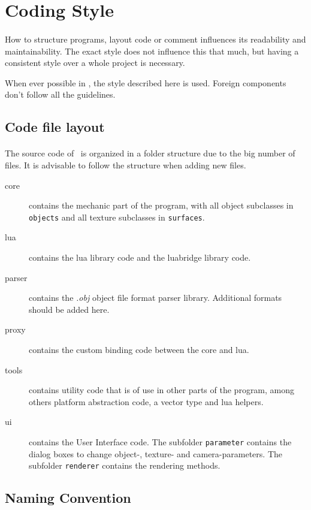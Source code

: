 \section{Coding Style\label{Style}}
\paragraph{}
How to structure programs, layout code or comment influences its readability and maintainability.
The exact style does not influence this that much, but having a consistent style over a whole project is necessary.

When ever possible in \ER, the style described here is used.
Foreign components don't follow all the guidelines.

\subsection{Code file layout}
\paragraph{}
The source code of \ER\ is organized in a folder structure due to the big number of files.
It is advisable to follow the structure when adding new files.

\begin{description}
\item[{core}] contains the mechanic part of the program, with all object subclasses in \texttt{objects} and all texture subclasses in \texttt{surfaces}.
\item[{lua}] contains the lua library code and the luabridge library code.
\item[{parser}] contains the \textit{.obj} object file format parser library.
Additional formats should be added here.
\item[{proxy}] contains the custom binding code between the core and lua.
\item[{tools}] contains utility code that is of use in other parts of the program, among others platform abstraction code, a vector type and lua helpers.
\item[{ui}] contains the User Interface code.
The subfolder \texttt{parameter} contains the dialog boxes to change object-, texture- and camera-parameters.
The subfolder \texttt{renderer} contains the rendering methods.
\end{description}

\subsection{Naming Convention}
